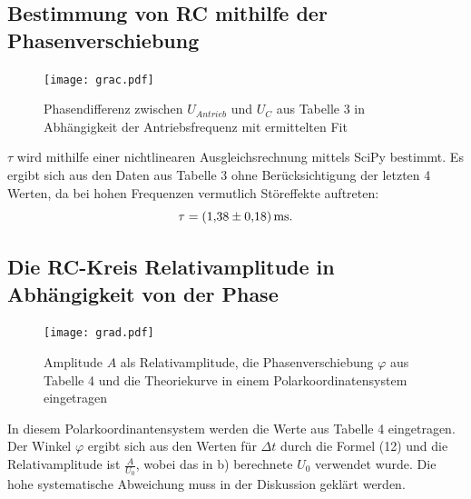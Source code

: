 \subsection{Bestimmung von RC mithilfe der Phasenverschiebung}
	 \begin{figure}[H]
	 	\centering
	 	\caption{Phasendifferenz zwischen $U_{Antrieb}$ und $U_C$ aus Tabelle 3 in Abhängigkeit der Antriebsfrequenz mit ermittelten Fit}
	 	\texttt{[image: grac.pdf]}
	 	\label{fig:grac}
	 \end{figure}
	 
	 $\tau$ wird mithilfe einer nichtlinearen Ausgleichsrechnung mittels SciPy \cite{scipy} bestimmt. Es ergibt sich aus den Daten aus Tabelle 3 ohne Berücksichtigung der letzten 4 Werten, da bei hohen Frequenzen vermutlich Störeffekte auftreten:
	 \begin{displaymath}
	 \tau = \SI{1.38 \pm 0.18}{\milli\second}\text{.}
	 \end{displaymath}
	 

	 \subsection{Die RC-Kreis Relativamplitude in Abhängigkeit von der Phase}

	 \begin{figure}[H]
	  \centering
	  \caption{Amplitude $A$ als Relativamplitude, die Phasenverschiebung $\varphi$ aus Tabelle 4 und die Theoriekurve in einem Polarkoordinatensystem eingetragen}
	  \texttt{[image: grad.pdf]}
	  \label{fig:grad}
	 \end{figure}
	 
	 In diesem Polarkoordinantensystem werden die Werte aus Tabelle 4 eingetragen. Der Winkel $\varphi$ ergibt sich aus den Werten für $\Delta t$ durch die Formel (12) und die Relativamplitude ist $\frac{A}{U_{0}}$, wobei das in b) berechnete $U_{0}$ verwendet wurde. Die hohe systematische Abweichung muss in der Diskussion geklärt werden.
	 
	 
	 
